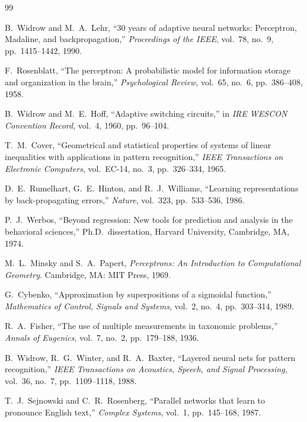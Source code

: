 \documentclass[11pt,a4paper]{article}
\begin{document}
\begin{thebibliography}{99}

B.~Widrow and M.~A.~Lehr,
``30 years of adaptive neural networks: Perceptron, Madaline, and backpropagation,''
\textit{Proceedings of the IEEE}, vol.~78, no.~9, pp.~1415--1442, 1990.

F.~Rosenblatt,
``The perceptron: A probabilistic model for information storage and organization in the brain,''
\textit{Psychological Review}, vol.~65, no.~6, pp.~386--408, 1958.

B.~Widrow and M.~E.~Hoff,
``Adaptive switching circuits,''
in \textit{IRE WESCON Convention Record}, vol.~4, 1960, pp.~96--104.

T.~M.~Cover,
``Geometrical and statistical properties of systems of linear inequalities with applications
in pattern recognition,''
\textit{IEEE Transactions on Electronic Computers}, vol.~EC-14, no.~3, pp.~326--334, 1965.

D.~E.~Rumelhart, G.~E.~Hinton, and R.~J.~Williams,
``Learning representations by back-propagating errors,''
\textit{Nature}, vol.~323, pp.~533--536, 1986.

P.~J.~Werbos,
``Beyond regression: New tools for prediction and analysis in the behavioral sciences,''
Ph.D.~dissertation, Harvard University, Cambridge, MA, 1974.

M.~L.~Minsky and S.~A.~Papert,
\textit{Perceptrons: An Introduction to Computational Geometry}.
Cambridge, MA: MIT Press, 1969.

G.~Cybenko,
``Approximation by superpositions of a sigmoidal function,''
\textit{Mathematics of Control, Signals and Systems}, vol.~2, no.~4, pp.~303--314, 1989.

R.~A.~Fisher,
``The use of multiple measurements in taxonomic problems,''
\textit{Annals of Eugenics}, vol.~7, no.~2, pp.~179--188, 1936.

B.~Widrow, R.~G.~Winter, and R.~A.~Baxter,
``Layered neural nets for pattern recognition,''
\textit{IEEE Transactions on Acoustics, Speech, and Signal Processing}, vol.~36, no.~7,
pp.~1109--1118, 1988.

T.~J.~Sejnowski and C.~R.~Rosenberg,
``Parallel networks that learn to pronounce English text,''
\textit{Complex Systems}, vol.~1, pp.~145--168, 1987.


\end{thebibliography}
\end{document}
